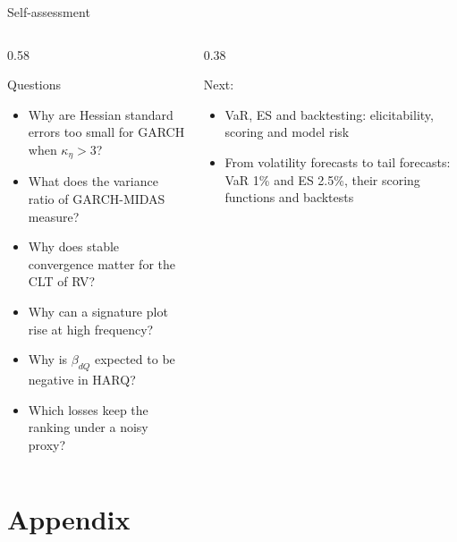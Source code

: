 \begin{frame}{Self-assessment}
\itemsize{\small}
\begin{columns}[T]
\begin{column}{0.58\textwidth}
\begin{block}{Questions}
\begin{itemize}
    \item Why are Hessian standard errors too small for GARCH when $\kappa_\eta > 3$?
    \item What does the variance ratio of GARCH-MIDAS measure?
    \item Why does stable convergence matter for the CLT of RV?
    \item Why can a signature plot rise at high frequency?
    \item Why is $\beta_{dQ}$ expected to be negative in HARQ?
    \item Which losses keep the ranking under a noisy proxy?
\end{itemize}
\end{block}
\end{column}
\begin{column}{0.38\textwidth}
\begin{block}{Next: }
\begin{itemize}
    \item VaR, ES and backtesting: elicitability, scoring and model risk
    \item From volatility forecasts to tail forecasts: VaR 1\% and ES 2.5\%, their scoring functions and backtests
\end{itemize}
\end{block}
\end{column}
\end{columns}
\end{frame}


\section{Appendix}

